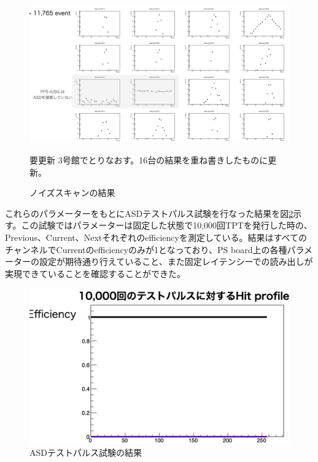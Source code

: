 \begin{figure} 
\centering
\includegraphics[width=16cm]{fig/QAQC/QAQCnoisescan.png}
\caption[ノイズスキャン]{ノイズスキャンの結果}
\begin{itembox}{要更新}
    3号館でとりなおす。16台の結果を重ね書きしたものに更新。
\end{itembox}
\label{QAQCnoisescan}
\end{figure}

これらのパラメーターをもとにASDテストパルス試験を行なった結果を図\ref{QAQCresult}示す。この試験ではパラメーターは固定した状態で10,000回TPTを発行した時の、Previous、Current、Nextそれぞれのefficiencyを測定している。結果はすべてのチャンネルでCurrentのefficiencyのみが1となっており、PS board上の各種パラメーターの設定が期待通り行えていること、また固定レイテンシーでの読み出しが実現できていることを確認することができた。

\begin{figure} 
\centering
\includegraphics[width=16cm]{fig/QAQC/QAQCresult.png}
\caption[ASDテストパルスの結果]{ASDテストパルス試験の結果}
\label{QAQCresult}
\end{figure}


